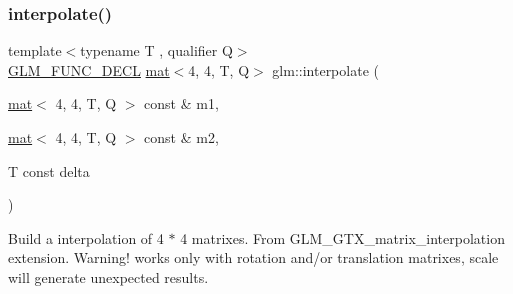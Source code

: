\subsubsection{\texorpdfstring{interpolate()}{interpolate()}}
{\footnotesize\ttfamily template$<$typename T , qualifier Q$>$ \\
\hyperlink{setup_8hpp_ab2d052de21a70539923e9bcbf6e83a51}{G\+L\+M\+\_\+\+F\+U\+N\+C\+\_\+\+D\+E\+CL} \hyperlink{structglm_1_1mat}{mat}$<$4, 4, T, Q$>$ glm\+::interpolate (\begin{DoxyParamCaption}\item[{\hyperlink{structglm_1_1mat}{mat}$<$ 4, 4, T, Q $>$ const \&}]{m1,  }\item[{\hyperlink{structglm_1_1mat}{mat}$<$ 4, 4, T, Q $>$ const \&}]{m2,  }\item[{T const}]{delta }\end{DoxyParamCaption})}

Build a interpolation of 4 $\ast$ 4 matrixes. From G\+L\+M\+\_\+\+G\+T\+X\+\_\+matrix\+\_\+interpolation extension. Warning! works only with rotation and/or translation matrixes, scale will generate unexpected results. 